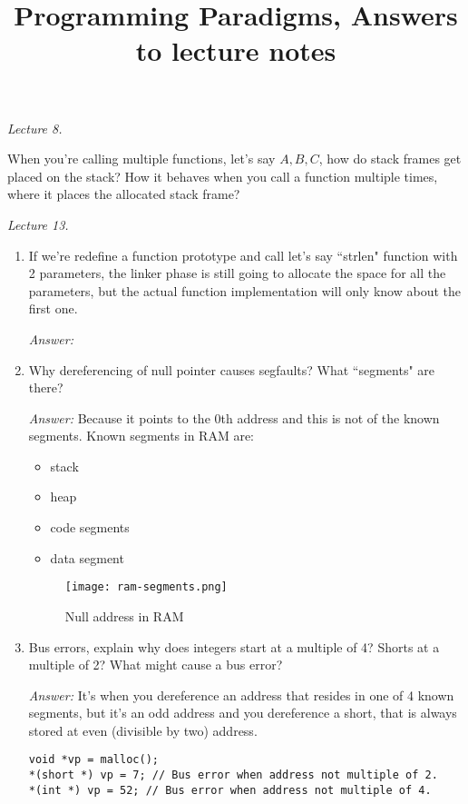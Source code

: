 

\title{Programming Paradigms, Answers to lecture notes}

\maketitle


\textit{Lecture 8.}

When you're calling multiple functions, let's say $A, B, C$, how do stack
frames get placed on the stack? How it behaves when you call a function
multiple times, where it places the allocated stack frame?

\textit{Lecture 13.}
\begin{enumerate}
    \item If we're redefine a function prototype and call let's say ``strlen"
    function with 2 parameters, the linker phase is still going to allocate the
    space for all the parameters, but the actual function implementation will only
    know about the first one.

    \textit{Answer:}

    \item Why dereferencing of null pointer causes segfaults? What ``segments" are there?

        \textit{Answer:}
        Because it points to the 0th address and this is not of the known
        segments. Known segments in RAM are:
        \begin{itemize}
            \item stack
            \item heap
            \item code segments
            \item data segment
        \end{itemize}

        \begin{figure}[h]
            \centering
            \texttt{[image: ram-segments.png]}
            \caption{Null address in RAM}%
            \label{fig:ram_segments}
        \end{figure}


    \item Bus errors, explain why does integers start at a multiple of 4?
        Shorts at a multiple of 2? What might cause a bus error?

        \textit{Answer:}
        It's when you dereference an address that resides in one of 4 known
        segments, but it's an odd address and you dereference a short, that is
        always stored at even (divisible by two) address.

        \begin{lstlisting}
void *vp = malloc();
*(short *) vp = 7; // Bus error when address not multiple of 2.
*(int *) vp = 52; // Bus error when address not multiple of 4.
        \end{lstlisting}
\end{enumerate}

